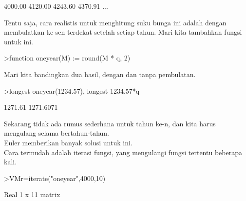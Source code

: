 \documentclass[a4paper,10pt]{article}
\begin{document}
\begin{eulernotebook}
\begin{eulercomment}
\begin{eulercomment}
\begin{eulercomment}
\begin{eulercomment}
\begin{euleroutput}
      4000.00     4120.00     4243.60     4370.91     ...
\end{euleroutput}
\begin{eulercomment}
Tentu saja, cara realistis untuk menghitung suku bunga ini adalah
dengan membulatkan ke sen terdekat setelah setiap tahun. Mari kita
tambahkan fungsi untuk ini.
\end{eulercomment}
\begin{eulerprompt}
>function oneyear(M) := round(M * q, 2)
\end{eulerprompt}
\begin{eulercomment}
Mari kita bandingkan dua hasil, dengan dan tanpa pembulatan.
\end{eulercomment}
\begin{eulerprompt}
>longest oneyear(1234.57), longest 1234.57*q
\end{eulerprompt}
\begin{euleroutput}
                  1271.61 
                1271.6071 
\end{euleroutput}
\begin{eulercomment}
Sekarang tidak ada rumus sederhana untuk tahun ke-n, dan kita harus
mengulang selama bertahun-tahun.\\
Euler memberikan banyak solusi untuk ini.\\
Cara termudah adalah iterasi fungsi, yang mengulangi fungsi tertentu
beberapa kali.
\end{eulercomment}
\begin{eulerprompt}
>VMr=iterate("oneyear",4000,10)
\end{eulerprompt}
\begin{euleroutput}
  Real 1 x 11 matrix
  

\end{euleroutput}
\end{eulercomment}
\end{eulercomment}
\end{eulercomment}
\end{eulercomment}
\end{eulernotebook}
\end{document}
